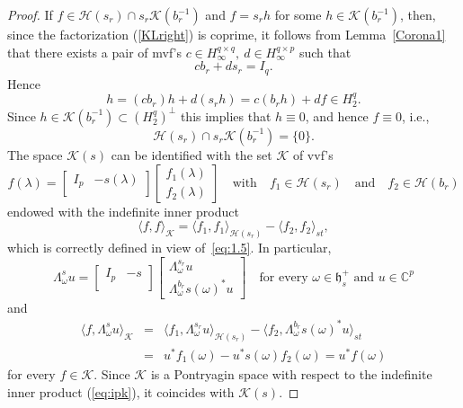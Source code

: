\documentclass[12pt,twoside,a4paper]{amsart}
\theoremstyle{definition}
\numberwithin{equation}{section}
\begin{document}
\begin{proof}
If $f\in{{\mathcal H}}(s_r)\cap s_r{{\mathcal K}}(b^{-1}_r)$ and $f=s_r h$ for some
$h\in {{\mathcal K}}(b^{-1}_r)$, then,  since the factorization (\ref{KLright}) is
coprime, it follows from
Lemma~\ref{Corona1} that there exists a pair of mvf's
$c\in H^{q\times q}_\infty,\ d\in H^{q\times p}_\infty$ such that
\begin{equation}\label{eq:1.5A}
   cb_r+ds_r=I_q.
\end{equation}
Hence
$$
h=(cb_r) h+d(s_rh)=c(b_rh)+df\in H^q_2.
$$
Since $h\in{{\mathcal K}}(b_r^{-1})\subset (H^q_2)^\perp$ this implies that
$h\equiv 0$, and hence $f\equiv 0$, i.e.,
    \begin{equation}\label{eq:1.5}
  {{\mathcal H}}(s_r)\cap s_r{{\mathcal K}}(b^{-1}_r)=\{0\}.
\end{equation}
The space ${{\mathcal K}}(s)$ can be identified with the set ${{\mathcal K}}$ of vvf's
\begin{equation}\label{eq:Ks}
f({\lambda})=
\left[\begin{array}{cc}
  I_p & -s({\lambda}) \\
\end{array}\right]
 \begin{bmatrix}f_1({\lambda})\\f_2({\lambda})\end{bmatrix}
\quad\text{with}\quad f_1\in{{\mathcal H}}(s_r)\quad\text{and}\quad
f_2\in{{\mathcal H}}(b_r)
\end{equation}
endowed with the indefinite inner product
\begin{equation}
\label{eq:ipk} \langle f, f\rangle_{{\mathcal K}}=\langle f_1,
f_1\rangle_{{{\mathcal H}}(s_r)}-\langle f_2, f_2\rangle_{st},
\end{equation}
which is correctly defined in view of~\eqref{eq:1.5}. In particular,
\begin{equation}
\label{eq:Lu} {\mathsf \Lambda}^s_\omega u=\left[\begin{array}{cc}
  I_p & -s \\
\end{array}\right]
\begin{bmatrix}{\mathsf \Lambda}^{s_r}_\omega u \\
{\mathsf \Lambda}^{b_r}_\omega s(\omega)^*u\end{bmatrix} \quad
\text{for every $\omega\in{{\mathfrak h}}_s^+$ and $u\in{\mathbb{C}}^p$}
\end{equation}
and
\begin{eqnarray*}
\langle f,{\mathsf \Lambda}^s_\omega u\rangle_{{\mathcal K}}&=& \langle f_1, {\mathsf
\Lambda}^{s_r}_\omega u
\rangle_{{{\mathcal H}}(s_r)}-\langle f_2, {\mathsf \Lambda}^{b_r}_\omega s(\omega)^*u\rangle_{st}\\
&=&u^*f_1(\omega)-u^*s(\omega)f_2(\omega)=u^*f(\omega)
\end{eqnarray*}
for every $f\in{{\mathcal K}}$. Since ${{\mathcal K}}$ is a Pontryagin space with respect
to the indefinite inner product (\ref{eq:ipk}), it coincides with
${{\mathcal K}}(s)$.


\end{proof}
\end{document}
